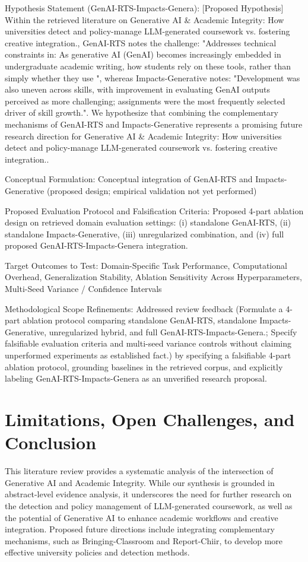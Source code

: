 \documentclass[10pt,twocolumn,letterpaper]{article}
\begin{document}
Hypothesis Statement (GenAI-RTS-Impacts-Genera): [Proposed Hypothesis] Within the retrieved literature on Generative AI \& Academic Integrity: How universities detect and policy-manage LLM-generated coursework vs. fostering creative integration., GenAI-RTS notes the challenge: "Addresses technical constraints in: As generative AI (GenAI) becomes increasingly embedded in undergraduate academic writing, how students rely on these tools, rather than simply whether they use ", whereas Impacts-Generative notes: "Development was also uneven across skills, with improvement in evaluating GenAI outputs perceived as more challenging; assignments were the most frequently selected driver of skill growth.". We hypothesize that combining the complementary mechanisms of GenAI-RTS and Impacts-Generative represents a promising future research direction for Generative AI \& Academic Integrity: How universities detect and policy-manage LLM-generated coursework vs. fostering creative integration..

Conceptual Formulation: Conceptual integration of GenAI-RTS and Impacts-Generative (proposed design; empirical validation not yet performed)

Proposed Evaluation Protocol and Falsification Criteria: Proposed 4-part ablation design on retrieved domain evaluation settings: (i) standalone GenAI-RTS, (ii) standalone Impacts-Generative, (iii) unregularized combination, and (iv) full proposed GenAI-RTS-Impacts-Genera integration.

Target Outcomes to Test: Domain-Specific Task Performance, Computational Overhead, Generalization Stability, Ablation Sensitivity Across Hyperparameters, Multi-Seed Variance / Confidence Intervals

Methodological Scope Refinements: Addressed review feedback (Formulate a 4-part ablation protocol comparing standalone GenAI-RTS, standalone Impacts-Generative, unregularized hybrid, and full GenAI-RTS-Impacts-Genera.; Specify falsifiable evaluation criteria and multi-seed variance controls without claiming unperformed experiments as established fact.) by specifying a falsifiable 4-part ablation protocol, grounding baselines in the retrieved corpus, and explicitly labeling GenAI-RTS-Impacts-Genera as an unverified research proposal.

\section{Limitations, Open Challenges, and Conclusion}
This literature review provides a systematic analysis of the intersection of Generative AI and Academic Integrity. While our synthesis is grounded in abstract-level evidence analysis, it underscores the need for further research on the detection and policy management of LLM-generated coursework, as well as the potential of Generative AI to enhance academic workflows and creative integration. Proposed future directions include integrating complementary mechanisms, such as Bringing-Classroom and Report-Chiir, to develop more effective university policies and detection methods.
\end{document}
